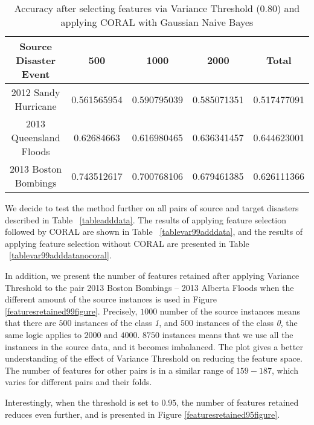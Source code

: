 \begin{table}[ht]
    \begin{center}
    \caption{Accuracy after selecting features via Variance Threshold (0.80) and applying CORAL with Gaussian Naive Bayes}
    \begin{tabular}[c]{|c|c|c|c|c|}
        \hline
        Source Disaster Event & 500 & 1000 & 2000 & Total \\
        \hline
        2012 Sandy Hurricane & 0.561565954 & 0.590795039 & 0.585071351 & 0.517477091 \\
        2013 Queensland Floods & 0.62684663 & 0.616980465 & 0.636341457 & 0.644623001 \\
        2013 Boston Bombings & 0.743512617 & 0.700768106 & 0.679461385 & 0.626111366 \\
        \hline
    \end{tabular}
    \label{tablevar8}
   \end{center}
\end{table}

We decide to test the method further on all pairs of source and target disasters described in Table ~\ref{tableadddata}. The results of applying feature selection followed by CORAL are shown in Table ~\ref{tablevar99adddata}, and the results of applying feature selection without CORAL are presented in Table ~\ref{tablevar99adddatanocoral}. 

In addition, we present the number of features retained after applying Variance Threshold to the pair 2013 Boston Bombings -- 2013 Alberta Floods when the different amount of the source instances is used in Figure \ref{featuresretained99figure}. Precisely, $1000$ number of the source instances means that there are $500$ instances of the class \textit{1}, and $500$ instances of the class \textit{0}, the same logic applies to $2000$ and $4000$. $8750$ instances means that we use all the instances in the source data, and it becomes imbalanced. The plot gives a better understanding of the effect of Variance Threshold on reducing the feature space. The number of features for other pairs is in a similar range of $159-187$, which varies for different pairs and their folds.

Interestingly, when the threshold is set to $0.95$, the number of features retained reduces even further, and is presented in Figure \ref{featuresretained95figure}. 


